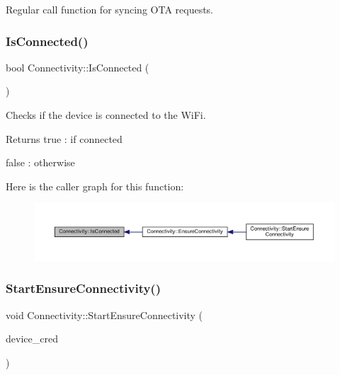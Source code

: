 Regular call function for syncing O\+TA requests. 

\mbox{\label{classConnectivity_a806034c9ce5234a7fcc5370d5b6e8362}} 
\subsubsection{\texorpdfstring{Is\+Connected()}{IsConnected()}}
{\footnotesize\ttfamily bool Connectivity\+::\+Is\+Connected (\begin{DoxyParamCaption}{ }\end{DoxyParamCaption})}



Checks if the device is connected to the Wi\+Fi. 

\begin{DoxyReturn}{Returns}
true \+: if connected 

false \+: otherwise 
\end{DoxyReturn}
Here is the caller graph for this function\+:
\nopagebreak
\begin{figure}[H]
\begin{center}
\leavevmode
\includegraphics[width=350pt]{classConnectivity_a806034c9ce5234a7fcc5370d5b6e8362_icgraph}
\end{center}
\end{figure}
\mbox{\label{classConnectivity_a15482263a17c51293756870cdb516f81}} 
\subsubsection{\texorpdfstring{Start\+Ensure\+Connectivity()}{StartEnsureConnectivity()}}
{\footnotesize\ttfamily void Connectivity\+::\+Start\+Ensure\+Connectivity (\begin{DoxyParamCaption}\item[{const \hyperlink{structCONFIG__SET_1_1DEVICE__CRED}{C\+O\+N\+F\+I\+G\+\_\+\+S\+E\+T\+::\+D\+E\+V\+I\+C\+E\+\_\+\+C\+R\+ED}}]{device\+\_\+cred }\end{DoxyParamCaption})}



